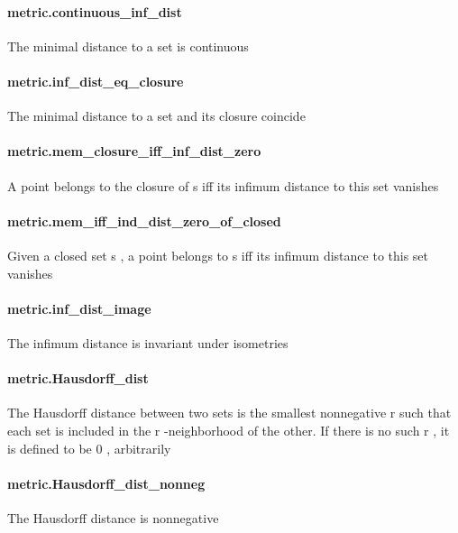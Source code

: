 \documentclass{article}
\begin{document}
\paragraph{metric.continuous\_inf\_dist}
\par
The minimal distance to a set is continuous
\paragraph{metric.inf\_dist\_eq\_closure}
\par
The minimal distance to a set and its closure coincide
\paragraph{metric.mem\_closure\_iff\_inf\_dist\_zero}
\par
A point belongs to the closure of 
\colorbox[RGB]{253,246,227}{{{{\color[RGB]{101, 123, 131} s }}}} iff its infimum distance to this set vanishes
\paragraph{metric.mem\_iff\_ind\_dist\_zero\_of\_closed}
\par
Given a closed set 
\colorbox[RGB]{253,246,227}{{{{\color[RGB]{101, 123, 131} s }}}}, a point belongs to 
\colorbox[RGB]{253,246,227}{{{{\color[RGB]{101, 123, 131} s }}}} iff its infimum distance to this set vanishes
\paragraph{metric.inf\_dist\_image}
\par
The infimum distance is invariant under isometries
\paragraph{metric.Hausdorff\_dist}
\par
The Hausdorff distance between two sets is the smallest nonnegative 
\colorbox[RGB]{253,246,227}{{{{\color[RGB]{101, 123, 131} r }}}} such that each set is
included in the 
\colorbox[RGB]{253,246,227}{{{{\color[RGB]{101, 123, 131} r }}}}-neighborhood of the other. If there is no such 
\colorbox[RGB]{253,246,227}{{{{\color[RGB]{101, 123, 131} r }}}}, it is defined to
be 
\colorbox[RGB]{253,246,227}{{{{\color[RGB]{108, 113, 196} 0 }}}}, arbitrarily
\paragraph{metric.Hausdorff\_dist\_nonneg}
\par
The Hausdorff distance is nonnegative
\end{document}
